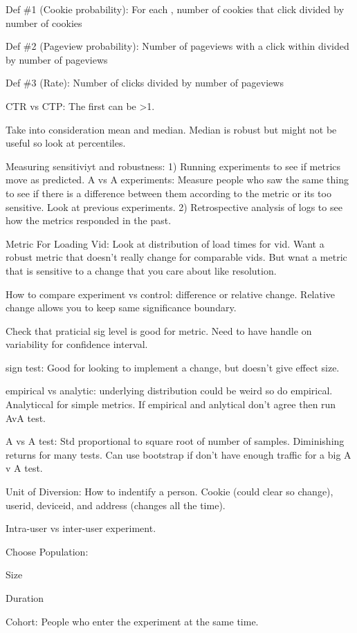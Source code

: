\documentclass[]{book}
\begin{document}
Def \#1 (Cookie probability): For each , number of cookies that click divided by number of cookies

Def \#2 (Pageview probability): Number of pageviews with a click within divided by number of pageviews

Def \#3 (Rate): Number of clicks divided by number of pageviews

CTR vs CTP: The first can be \textgreater{}1.

Take into consideration mean and median. Median is robust but might not be useful so look at percentiles.

Measuring sensitiviyt and robustness: 1) Running experiments to see if metrics move as predicted. A vs A experiments: Measure people who saw the same thing to see if there is a difference between them according to the metric or its too sensitive. Look at previous experiments. 2) Retrospective analysis of logs to see how the metrics responded in the past.

Metric For Loading Vid: Look at distribution of load times for vid. Want a robust metric that doesn't really change for comparable vids. But wnat a metric that is sensitive to a change that you care about like resolution.

How to compare experiment vs control: difference or relative change. Relative change allows you to keep same significance boundary.

Check that praticial sig level is good for metric. Need to have handle on variability for confidence interval.

sign test: Good for looking to implement a change, but doesn't give effect size.

empirical vs analytic: underlying distribution could be weird so do empirical. Analyticcal for simple metrics. If empirical and anlytical don't agree then run AvA test.

A vs A test: Std proportional to square root of number of samples. Diminishing returns for many tests. Can use bootstrap if don't have enough traffic for a big A v A test.

Unit of Diversion: How to indentify a person. Cookie (could clear so change), userid, deviceid, and address (changes all the time).

Intra-user vs inter-user experiment.

Choose Population:

Size

Duration

Cohort: People who enter the experiment at the same time.
\end{document}

